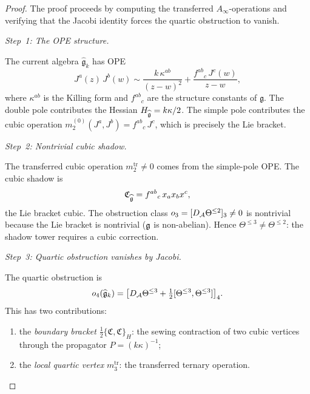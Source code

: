 \begin{proof}
The proof proceeds by computing the
transferred $A_\infty$-operations and verifying that the
Jacobi identity forces the quartic obstruction to vanish.

\medskip
\emph{Step~1: The OPE structure.}

The current algebra $\widehat{\mathfrak{g}}_k$ has OPE
\begin{equation}%
J^a(z)\,J^b(w)
\sim \frac{k\,\kappa^{ab}}{(z-w)^2}
+ \frac{f^{ab}{}_c\,J^c(w)}{z-w},
\end{equation}
where $\kappa^{ab}$ is the Killing form and $f^{ab}{}_c$
are the structure constants of $\mathfrak{g}$. The double
pole contributes the Hessian $H_{\widehat{\mathfrak{g}}} = k\kappa/2$.
The simple pole contributes the cubic operation
$m_2^{(0)}(J^a, J^b) = f^{ab}{}_c\,J^c$, which is
precisely the Lie bracket.

\medskip
\emph{Step~2: Nontrivial cubic shadow.}

The transferred cubic operation
$m_2^{\mathrm{tr}} \neq 0$ comes from the simple-pole
OPE. The cubic shadow is
\begin{equation}%
\mathfrak{C}_{\widehat{\fg}} =
f^{ab}{}_c\,x_a x_b x^c,
\end{equation}
the Lie bracket cubic. The obstruction class
$o_3 = [D_{\mathcal{A}} \Theta^{\leq 2}]_3 \neq 0$ is nontrivial
because the Lie bracket is nontrivial ($\mathfrak{g}$ is non-abelian).
Hence $\Theta^{\leq 3} \neq \Theta^{\leq 2}$: the shadow
tower requires a cubic correction.

\medskip
\emph{Step~3: Quartic obstruction vanishes by Jacobi.}

The quartic obstruction is
\begin{equation}%
o_4(\widehat{\fg}_k) =
\bigl[D_\cA \Theta^{\leq 3}
+ \tfrac{1}{2}[\Theta^{\leq 3}, \Theta^{\leq 3}]
\bigr]_4.
\end{equation}
This has two contributions:
\begin{enumerate}[label=(\alph*)]
\item the \emph{boundary bracket}
 $\frac{1}{2}\{\mathfrak{C}, \mathfrak{C}\}_H$:
 the sewing contraction of two cubic vertices through
 the propagator $P = (k\kappa)^{-1}$;
\item the \emph{local quartic vertex}
 $m_3^{\mathrm{tr}}$: the transferred ternary operation.
\end{enumerate}


\end{proof}
